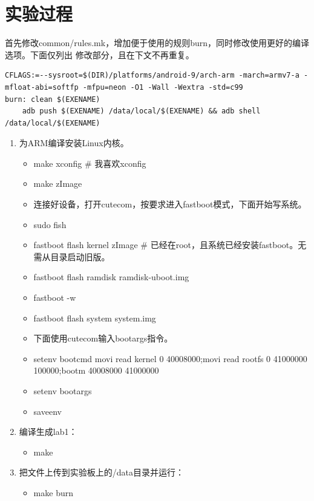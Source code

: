 \documentclass{report}
\begin{document}
\section{实验过程}
\par 首先修改common/rules.mk，增加便于使用的规则burn，同时修改使用更好的编译选项。下面仅列出
修改部分，且在下文不再重复。

\begin{lstlisting}
CFLAGS:=--sysroot=$(DIR)/platforms/android-9/arch-arm -march=armv7-a -mfloat-abi=softfp -mfpu=neon -O1 -Wall -Wextra -std=c99
burn: clean $(EXENAME)
	adb push $(EXENAME) /data/local/$(EXENAME) && adb shell /data/local/$(EXENAME)
\end{lstlisting}


\begin{enumerate}
    \item 为ARM编译安装Linux内核。
        \begin{itemize}
            \item make xconfig \# 我喜欢xconfig
            \item make zImage
            \item 连接好设备，打开cutecom，按要求进入fastboot模式，下面开始写系统。
            \item sudo fish
            \item fastboot flash kernel zImage \# 已经在root，且系统已经安装fastboot。无需从目录启动旧版。
            \item fastboot flash ramdisk ramdisk-uboot.img
            \item fastboot -w
            \item fastboot flash system system.img
            \item 下面使用cutecom输入bootargs指令。
            \item setenv bootcmd movi read kernel 0 40008000;movi read rootfs 0 41000000 100000;bootm 40008000 41000000
            \item setenv bootargs
            \item saveenv
        \end{itemize}
    \item 编译生成lab1：
        \begin{itemize}
            \item make
        \end{itemize}
    \item 把文件上传到实验板上的/data目录并运行：
        \begin{itemize}
            \item make burn
        \end{itemize}
\end{enumerate}
\end{document}
